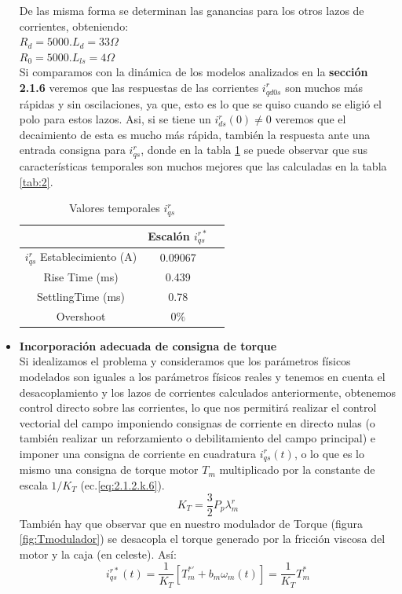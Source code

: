 \documentclass[10pt]{article}
\begin{document}
\begin{itemize}
	De las misma forma se determinan las ganancias para los otros lazos de corrientes, obteniendo:\\
	$R_{d}=5000 . L_{d}=33\Omega$\\
	$R_{0}=5000 . L_{ls}=4\Omega$\\
	Si comparamos con la dinámica de los modelos analizados en la \textbf{sección 2.1.6} veremos que las respuestas de las corrientes $i^{r}_{qd0s}$ son muchos más rápidas y sin oscilaciones, ya que, esto es lo que se quiso cuando se eligió el polo para estos lazos. Asi, si se tiene un $i^{r}_{ds}(0)\neq 0$ veremos que el decaimiento de esta es mucho más rápida, también la respuesta ante una entrada consigna para $i^{r}_{qs}$, donde en la tabla \ref{tab:3} se puede observar que sus características temporales son muchos mejores que las calculadas en la tabla \ref{tab:2}.
		\begin{table}[!h]
	\begin{center}
	\begin{tabular}{| c | c | c | }
	\hline
	  & Escalón $i^{r*}_{qs}$\\ \hline
	 $ i^{r}_{qs}$ Establecimiento (A) &   0.09067 \\ \hline
	 Rise Time (ms) &  0.439\\ \hline
	SettlingTime (ms)& 0.78\\ \hline
	Overshoot &0$\%$ \\ \hline
	\end{tabular}
	\caption{Valores temporales $i^{r}_{qs}$}
	\label{tab:3}
	\end{center}
	\end{table}
	
\item \textbf{Incorporación adecuada de consigna de torque}\\
Si idealizamos el problema y consideramos que los parámetros físicos modelados son iguales a los parámetros físicos reales y tenemos en cuenta el desacoplamiento y los lazos de corrientes calculados anteriormente, obtenemos control directo sobre las corrientes, lo que nos permitirá realizar el control vectorial del campo imponiendo consignas de corriente en directo nulas (o también realizar un reforzamiento o debilitamiento del campo principal) e imponer una consigna de corriente en cuadratura $i^{r}_{qs}(t)$, o  lo que es lo mismo una consigna de torque motor $T_{m}$ multiplicado por la constante de escala $1/K_{T}$ (ec.\ref{eq:2.1.2.k.6}).
		\begin{equation}
	K_{T}=\frac{3}{2}P_{p}\lambda^{r}_{m}
	\label{eq:2.1.2.k.6}
	\end{equation}
	También hay que observar que en nuestro modulador de Torque (figura \ref{fig:Tmodulador}) se desacopla el torque generado por la fricción viscosa del motor y la caja (en celeste). Así:
			\begin{equation}
	i^{r*}_{qs}(t)=\frac{1}{K_{T}}[T^{*'}_{m}+b_{m}\omega_{m}(t)]=\frac{1}{K_{T}}T^{*}_{m}
	\label{eq:2.1.2.k.7}
	\end{equation}
	

\end{itemize}
\end{document}
